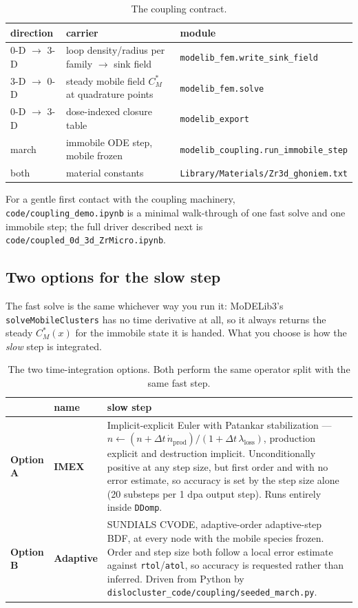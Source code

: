\documentclass[11pt]{article}
\newcommand{\MoD}{\textsf{MoDELib3}}
\newcommand{\code}[1]{\texttt{\small #1}}
\newcommand{\file}[1]{\texttt{\footnotesize #1}}
\begin{document}
\begin{table}[htbp]
\centering
\caption{The coupling contract.}
\label{tab:coupling}
\begin{tabular}{@{}lll@{}}
\toprule
direction & carrier & module \\
\midrule
0-D $\rightarrow$ 3-D & loop density/radius per family $\rightarrow$ sink field &
\code{modelib\_fem.write\_sink\_field} \\
3-D $\rightarrow$ 0-D & steady mobile field $C_M^{*}$ at quadrature points &
\code{modelib\_fem.solve} \\
0-D $\rightarrow$ 3-D & dose-indexed closure table & \code{modelib\_export} \\
march & immobile ODE step, mobile frozen & \code{modelib\_coupling.run\_immobile\_step} \\
both & material constants & \file{Library/Materials/Zr3d\_ghoniem.txt} \\
\bottomrule
\end{tabular}
\end{table}

For a gentle first contact with the coupling machinery,
\file{code/coupling\_demo.ipynb} is a minimal walk-through of one fast solve
and one immobile step; the full driver described next is
\file{code/coupled\_0d\_3d\_ZrMicro.ipynb}.

\subsection{Two options for the slow step}
\label{sec:options}

The fast solve is the same whichever way you run it: \MoD{}'s
\code{solveMobileClusters} has no time derivative at all, so it always returns
the steady $C_M^{*}(x)$ for the immobile state it is handed. What you choose
is how the \emph{slow} step is integrated.

\begin{table}[htbp]
\centering
\caption{The two time-integration options. Both perform the same operator
         split with the same fast step.}
\label{tab:options}
\begin{tabular}{@{}llp{7.6cm}@{}}
\toprule
 & name & slow step \\
\midrule
\textbf{Option A} & \textbf{IMEX} &
  Implicit-explicit Euler with Patankar stabilization ---
  $n \leftarrow (n + \Delta t\,\dot n_{\mathrm{prod}}) /
   (1 + \Delta t\,\lambda_{\mathrm{loss}})$, production explicit and
  destruction implicit. Unconditionally positive at any step size, but first
  order and with no error estimate, so accuracy is set by the step size alone
  (20 substeps per 1 \textrm{dpa} output step). Runs entirely inside
  \code{DDomp}. \\[4pt]
\textbf{Option B} & \textbf{Adaptive} &
  SUNDIALS CVODE, adaptive-order adaptive-step BDF, at every node with the
  mobile species frozen. Order and step size both follow a local error
  estimate against \code{rtol}/\code{atol}, so accuracy is requested rather
  than inferred. Driven from Python by
  \code{dislocluster\_code/coupling/seeded\_march.py}. \\
\bottomrule
\end{tabular}
\end{table}
\end{document}
